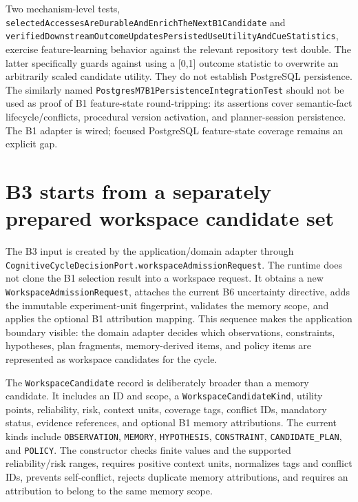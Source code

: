 Two mechanism-level tests, \texttt{selected\allowbreak{}Accesses\allowbreak{}Are\allowbreak{}Durable\allowbreak{}And\allowbreak{}Enrich\allowbreak{}The\allowbreak{}Next\allowbreak{}B1\allowbreak{}Candidate} and \texttt{verified\allowbreak{}Downstream\allowbreak{}Outcome\allowbreak{}Updates\allowbreak{}Persisted\allowbreak{}Use\allowbreak{}Utility\allowbreak{}And\allowbreak{}Cue\allowbreak{}Statistics}, exercise feature-learning behavior against the relevant repository test double. The latter specifically guards against using a [0,1] outcome statistic to overwrite an arbitrarily scaled candidate utility. They do not establish PostgreSQL persistence. The similarly named \texttt{Postgres\allowbreak{}M7\allowbreak{}B1\allowbreak{}Persistence\allowbreak{}Integration\allowbreak{}Test} should not be used as proof of B1 feature-state round-tripping: its assertions cover semantic-fact lifecycle/conflicts, procedural version activation, and planner-session persistence. The B1 adapter is wired; focused PostgreSQL feature-state coverage remains an explicit gap.

\section{B3 starts from a separately prepared workspace candidate set}
\label{sec:ch21-b3-candidates}

The B3 input is created by the application/domain adapter through \texttt{Cognitive\allowbreak{}Cycle\allowbreak{}Decision\allowbreak{}Port.\allowbreak{}workspace\allowbreak{}Admission\allowbreak{}Request}. The runtime does not clone the B1 selection result into a workspace request. It obtains a new \texttt{Workspace\allowbreak{}Admission\allowbreak{}Request}, attaches the current B6 uncertainty directive, adds the immutable experiment-unit fingerprint, validates the memory scope, and applies the optional B1 attribution mapping. This sequence makes the application boundary visible: the domain adapter decides which observations, constraints, hypotheses, plan fragments, memory-derived items, and policy items are represented as workspace candidates for the cycle.

The \texttt{WorkspaceCandidate} record is deliberately broader than a memory candidate. It includes an ID and scope, a \texttt{Workspace\allowbreak{}Candidate\allowbreak{}Kind}, utility points, reliability, risk, context units, coverage tags, conflict IDs, mandatory status, evidence references, and optional B1 memory attributions. The current kinds include \texttt{OBSERVATION}, \texttt{MEMORY}, \texttt{HYPOTHESIS}, \texttt{CONSTRAINT}, \texttt{CANDIDATE\_PLAN}, and \texttt{POLICY}. The constructor checks finite values and the supported reliability/risk ranges, requires positive context units, normalizes tags and conflict IDs, prevents self-conflict, rejects duplicate memory attributions, and requires an attribution to belong to the same memory scope.

